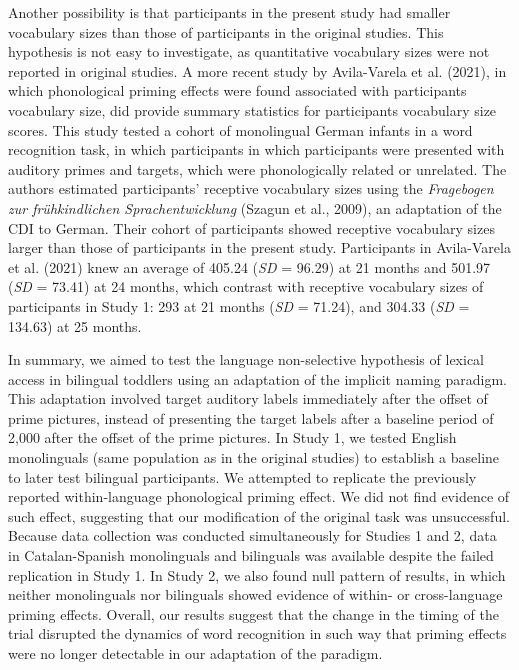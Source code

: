 \documentclass[
  12pt,
  b5paperpaper,
  twoside]{scrreprt}
\begin{document}
Another possibility is that participants in the present study had
smaller vocabulary sizes than those of participants in the original
studies. This hypothesis is not easy to investigate, as quantitative
vocabulary sizes were not reported in original studies. A more recent
study by Avila-Varela et al. (2021), in which phonological priming
effects were found associated with participants vocabulary size, did
provide summary statistics for participants vocabulary size scores. This
study tested a cohort of monolingual German infants in a word
recognition task, in which participants in which participants were
presented with auditory primes and targets, which were phonologically
related or unrelated. The authors estimated participants' receptive
vocabulary sizes using the \emph{Fragebogen zur frühkindlichen
Sprachentwicklung} (Szagun et al., 2009), an adaptation of the CDI to
German. Their cohort of participants showed receptive vocabulary sizes
larger than those of participants in the present study. Participants in
Avila-Varela et al. (2021) knew an average of 405.24 (\emph{SD} = 96.29)
at 21 months and 501.97 (\emph{SD} = 73.41) at 24 months, which contrast
with receptive vocabulary sizes of participants in Study 1: 293 at 21
months (\emph{SD} = 71.24), and 304.33 (\emph{SD} = 134.63) at 25
months.

In summary, we aimed to test the language non-selective hypothesis of
lexical access in bilingual toddlers using an adaptation of the implicit
naming paradigm. This adaptation involved target auditory labels
immediately after the offset of prime pictures, instead of presenting
the target labels after a baseline period of 2,000 after the offset of
the prime pictures. In Study 1, we tested English monolinguals (same
population as in the original studies) to establish a baseline to later
test bilingual participants. We attempted to replicate the previously
reported within-language phonological priming effect. We did not find
evidence of such effect, suggesting that our modification of the
original task was unsuccessful. Because data collection was conducted
simultaneously for Studies 1 and 2, data in Catalan-Spanish monolinguals
and bilinguals was available despite the failed replication in Study 1.
In Study 2, we also found null pattern of results, in which neither
monolinguals nor bilinguals showed evidence of within- or cross-language
priming effects. Overall, our results suggest that the change in the
timing of the trial disrupted the dynamics of word recognition in such
way that priming effects were no longer detectable in our adaptation of
the paradigm.
\end{document}
